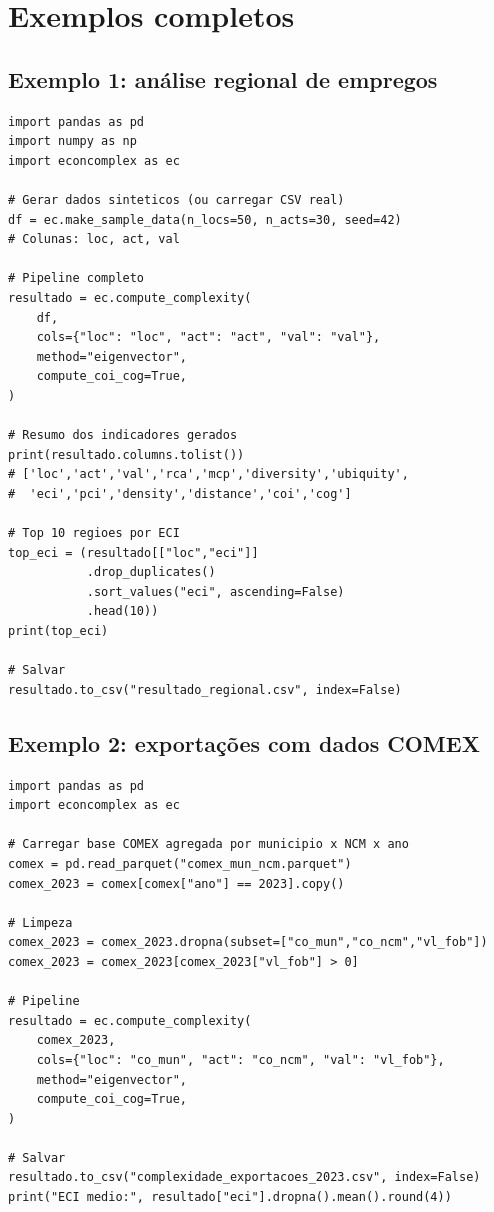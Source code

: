 \documentclass[12pt, a4paper]{article}
\begin{document}
\section{Exemplos completos}

\subsection{Exemplo 1: an\'{a}lise regional de empregos}

\begin{lstlisting}[caption={An\'{a}lise completa de emprego regional}]
import pandas as pd
import numpy as np
import econcomplex as ec

# Gerar dados sinteticos (ou carregar CSV real)
df = ec.make_sample_data(n_locs=50, n_acts=30, seed=42)
# Colunas: loc, act, val

# Pipeline completo
resultado = ec.compute_complexity(
    df,
    cols={"loc": "loc", "act": "act", "val": "val"},
    method="eigenvector",
    compute_coi_cog=True,
)

# Resumo dos indicadores gerados
print(resultado.columns.tolist())
# ['loc','act','val','rca','mcp','diversity','ubiquity',
#  'eci','pci','density','distance','coi','cog']

# Top 10 regioes por ECI
top_eci = (resultado[["loc","eci"]]
           .drop_duplicates()
           .sort_values("eci", ascending=False)
           .head(10))
print(top_eci)

# Salvar
resultado.to_csv("resultado_regional.csv", index=False)
\end{lstlisting}

\subsection{Exemplo 2: exporta\c{c}\~{o}es com dados COMEX}

\begin{lstlisting}[caption={An\'{a}lise de exportacoes com dados COMEX/MDIC}]
import pandas as pd
import econcomplex as ec

# Carregar base COMEX agregada por municipio x NCM x ano
comex = pd.read_parquet("comex_mun_ncm.parquet")
comex_2023 = comex[comex["ano"] == 2023].copy()

# Limpeza
comex_2023 = comex_2023.dropna(subset=["co_mun","co_ncm","vl_fob"])
comex_2023 = comex_2023[comex_2023["vl_fob"] > 0]

# Pipeline
resultado = ec.compute_complexity(
    comex_2023,
    cols={"loc": "co_mun", "act": "co_ncm", "val": "vl_fob"},
    method="eigenvector",
    compute_coi_cog=True,
)

# Salvar
resultado.to_csv("complexidade_exportacoes_2023.csv", index=False)
print("ECI medio:", resultado["eci"].dropna().mean().round(4))
\end{lstlisting}
\end{document}
